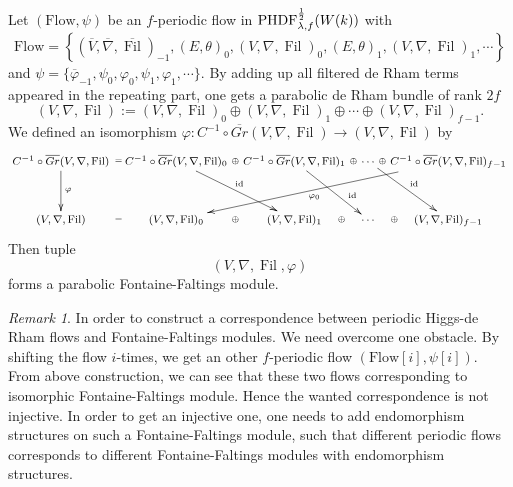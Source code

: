 \documentclass[12pt,twoside]{book}
\theoremstyle{plain}
\theoremstyle{definition}
\theoremstyle{remark}
\newtheorem{remark}[remark]{Remark}
\DeclareMathOperator\Fil{Fil}
\DeclareMathOperator\id{id}
\numberwithin{equation}{section}
\def\PHDFhf{\mathrm{PHDF}^{{1\over 2}}_{\lambda,f}}
\def\Flow{\mathrm{Flow}}
\begin{document}
Let $(\Flow,\psi)$ be an $f$-periodic flow in $\PHDFhf(W(k))$ with
\[\Flow = \left\{
(\overline{V},\overline{\nabla},\overline{\Fil})_{-1},
(E,\theta)_{0},(V,\nabla,\Fil)_{0},(E,\theta)_{1},(V,\nabla,\Fil)_{1},\cdots\right\}\]
and $\psi=\{\overline{\varphi}_{-1},\psi_{0},\varphi_{0},\psi_{1},\varphi_{1},\cdots\}$. By adding up all filtered de Rham terms appeared in the repeating part, one gets a parabolic de Rham bundle of rank $2f$
\begin{equation}\label{equ_dRtermsSum}
(V,\nabla,\Fil):= ( V,\nabla,\Fil)_0 \oplus ( V,\nabla,\Fil)_1 \oplus \cdots \oplus ( V,\nabla,\Fil)_{f-1}.
\end{equation}
We defined an isomorphism $\varphi\colon C^{-1} \circ \overline{Gr} ( V,\nabla,\Fil) \to ( V,\nabla,\Fil)$ by
\begin{equation*} \footnotesize
\xymatrix@C=2mm@R=1cm{
C^{-1} \circ \overline{Gr} ( V,\nabla,\Fil) \ar[d]^{\varphi} \ar@{}[r]|{=}
& C^{-1} \circ \overline{Gr} ( V,\nabla,\Fil)_0 \ar[dr]^{\id} \ar@{}[r]|-{\oplus}
& C^{-1} \circ \overline{Gr} ( V,\nabla,\Fil)_1 \ar[dr]^(0.7){\id} \ar@{}[r]|-{\oplus}
& \cdots \ar[dr]^{\id} \ar@{}[r]|-{\oplus}
& C^{-1} \circ \overline{Gr} ( V,\nabla,\Fil)_{f-1} \ar[dlll]^{\varphi_0}\\
( V,\nabla,\Fil) \ar@{}[r]|{=}
&( V,\nabla,\Fil)_0 \ar@{}[r]|-{\oplus}
&( V,\nabla,\Fil)_1 \ar@{}[r]|-{\oplus}
&\cdots \ar@{}[r]|-{\oplus}
&( V,\nabla,\Fil)_{f-1} \\
}
\end{equation*}
Then tuple
\begin{equation} \label{eq_HDF2FFM}
(V,\nabla,\Fil,\varphi)
\end{equation}
forms a parabolic Fontaine-Faltings module.

\begin{remark} In order to construct a correspondence between periodic Higgs-de Rham flows and Fontaine-Faltings modules. We need overcome one obstacle. By shifting the flow $i$-times, we get an other $f$-periodic flow $(\Flow[i],\psi[i])$. From above construction, we can see that these two flows corresponding to isomorphic Fontaine-Faltings module. Hence the wanted correspondence is not injective.
In order to get an injective one, one needs to add endomorphism structures on such a Fontaine-Faltings module, such that different periodic flows corresponds to different Fontaine-Faltings modules with endomorphism structures.
\end{remark}
\end{document}
